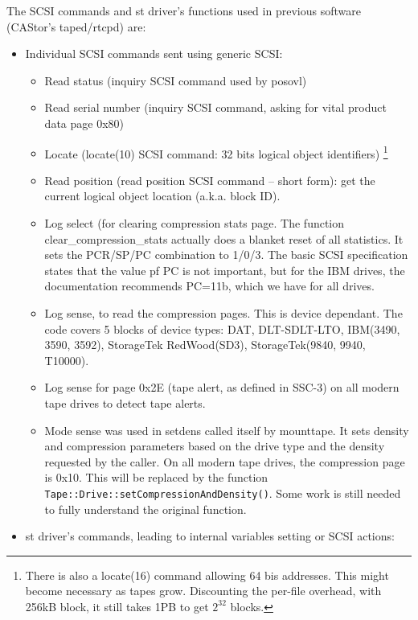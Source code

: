 The SCSI commands and st driver's functions used in previous software (CAStor's taped/rtcpd) are:
\begin{itemize}
\item Individual SCSI commands sent using generic SCSI:
  \begin{itemize}
    \item Read status (inquiry SCSI command used by posovl)
    \item Read serial number (inquiry SCSI command, asking for vital product data page 0x80)
    \item Locate (locate(10) SCSI command: 32 bits logical object identifiers)
                      \footnote{There is also a locate(16) command allowing 64 bis addresses.
                      This might become necessary as tapes grow. Discounting the per-file overhead,
                      with 256kB block, it still takes 1PB to get $2^{32}$ blocks.}
    \item Read position (read position SCSI command -- short form): get the current logical object
          location (a.k.a. block ID).
    \item Log select (for clearing compression stats page. The function clear\_compression\_stats
          actually does a blanket reset of all statistics. It sets the PCR/SP/PC combination
          to 1/0/3. The basic SCSI specification states that the value pf PC is not important,
          but for the IBM drives, the documentation recommends PC=11b, which we have for all drives.
    \item Log sense, to read the compression pages. This is device dependant. The code covers
          5 blocks of device types: DAT, DLT-SDLT-LTO, IBM(3490, 3590, 3592), StorageTek RedWood(SD3),
          StorageTek(9840, 9940, T10000).
    \item Log sense for page 0x2E (tape alert, as defined in SSC-3) on all modern tape drives to detect tape alerts.
    \item Mode sense was used in setdens called itself by mounttape. It sets density and compression
          parameters based on the drive type and the density requested by the caller. On all modern tape drives,
          the compression page is 0x10. This will be replaced by the function \verb#Tape::Drive::setCompressionAndDensity()#.
          Some work is still needed to fully understand the original function.
  \end{itemize}
\item st driver's commands, leading to internal variables setting or SCSI actions:

\end{itemize}
